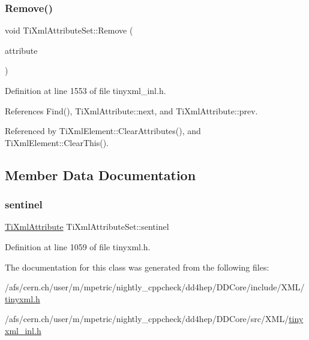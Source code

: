\subsubsection{\texorpdfstring{Remove()}{Remove()}}
{\footnotesize\ttfamily void Ti\+Xml\+Attribute\+Set\+::\+Remove (\begin{DoxyParamCaption}\item[{\hyperlink{class_ti_xml_attribute}{Ti\+Xml\+Attribute} $\ast$}]{attribute }\end{DoxyParamCaption})}



Definition at line 1553 of file tinyxml\+\_\+inl.\+h.



References Find(), Ti\+Xml\+Attribute\+::next, and Ti\+Xml\+Attribute\+::prev.



Referenced by Ti\+Xml\+Element\+::\+Clear\+Attributes(), and Ti\+Xml\+Element\+::\+Clear\+This().



\subsection{Member Data Documentation}
\hypertarget{class_ti_xml_attribute_set_a1fda20434a148e7d09dd3ecc8e85db9c}{}\label{class_ti_xml_attribute_set_a1fda20434a148e7d09dd3ecc8e85db9c} 
\subsubsection{\texorpdfstring{sentinel}{sentinel}}
{\footnotesize\ttfamily \hyperlink{class_ti_xml_attribute}{Ti\+Xml\+Attribute} Ti\+Xml\+Attribute\+Set\+::sentinel\hspace{0.3cm}{\ttfamily [private]}}



Definition at line 1059 of file tinyxml.\+h.



The documentation for this class was generated from the following files\+:\begin{DoxyCompactItemize}
\item 
/afs/cern.\+ch/user/m/mpetric/nightly\+\_\+cppcheck/dd4hep/\+D\+D\+Core/include/\+X\+M\+L/\hyperlink{tinyxml_8h}{tinyxml.\+h}\item 
/afs/cern.\+ch/user/m/mpetric/nightly\+\_\+cppcheck/dd4hep/\+D\+D\+Core/src/\+X\+M\+L/\hyperlink{tinyxml__inl_8h}{tinyxml\+\_\+inl.\+h}\end{DoxyCompactItemize}
